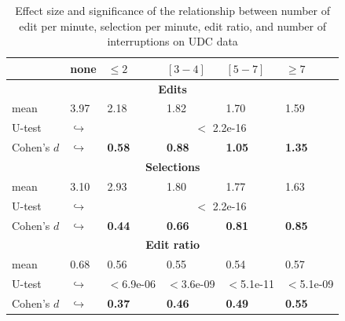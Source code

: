 \documentclass[times]{smrauth}
\begin{document}
\begin{table}[ht!]
\renewcommand{\arraystretch}{1.3}
\caption{Effect size and significance of the relationship between number of edit per minute, selection per minute, edit ratio, and number of interruptions on UDC data} 
\label{tbl:p_value_udc}
\centering
\begin{tabular}{l | p{0.75cm} | p{1cm} | p{1cm} | p{1cm} |p{1cm}} 

   & none & $\leq 2$ & $[3 - 4]$ & $[5 - 7]$ & $\geq 7$  \\  
  \hline
  \multicolumn{6}{c}{\textbf{Edits}} \\
  \hline
  mean & 3.97 &	2.18 & 1.82 & 1.70 & 1.59 \\ 
   \cline{3-6} 
  U-test & $\hookrightarrow$ & \multicolumn{4}{c}{$<$ 2.2e-16} \\
  \cline{3-6} 
  Cohen's $d$ & $\hookrightarrow$	& \textbf{0.58} & \textbf{0.88} & \textbf{1.05} & \textbf{1.35}    \\
  \hline
  
  
  \multicolumn{6}{c}{\textbf{Selections}} \\
  \hline 
  mean & 3.10 &	2.93 & 1.80 & 1.77 & 1.63  \\ 
     \cline{3-6} 
    U-test & $\hookrightarrow$ & \multicolumn{4}{c}{$<$ 2.2e-16} \\
    
  \cline{3-6} 
  Cohen's $d$ & $\hookrightarrow$	& \textbf{0.44} & \textbf{0.66} & \textbf{0.81} & \textbf{0.85} \\  
\hline


  \multicolumn{6}{c}{\textbf{Edit ratio}} \\
  \hline 
  mean & 0.68 & 0.56 & 0.55 & 0.54 & 0.57 \\ 
  \cline{3-6} 
     \cline{3-6} 
    U-test & $\hookrightarrow$ & $<$6.9e-06 & $<$3.6e-09 & $<$5.1e-11 & $<$5.1e-09  \\
    \cline{3-6} 
    Cohen's $d$ & $\hookrightarrow$ & \textbf{0.37} & \textbf{0.46} & \textbf{0.49} & \textbf{0.55} \\ 
\hline

\end{tabular}
\end{table}
\end{document}
